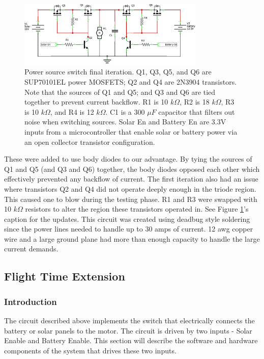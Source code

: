 \documentclass[12pt,journal,compsoc]{IEEEtran}
\begin{document}
\begin{figure}[h!]
\hspace*{0cm}
\centering
\includegraphics[width=3.5in]{solar_circuit3_schem.png}
\caption{Power source switch final iteration. Q1, Q3, Q5, and Q6 are SUP70101EL power MOSFETS; Q2 and Q4 are 2N3904 transistors. Note that the sources of Q1 and Q5; and Q3 and Q6 are tied together to prevent current backflow. R1 is 10 $k\Omega$, R2 is 18 $k\Omega$, R3 is 10 $k\Omega$, and R4 is 12 $k\Omega$. C1 is a 300 $\mu F$ capacitor that filters out noise when switching sources. Solar En and Battery En are 3.3V inputs from a microcontroller that enable solar or battery power via an open collector transistor configuration.}
\label{solSchem2}
\end{figure}
These were added to use body diodes to our advantage. By tying the sources of Q1 and Q5 (and Q3 and Q6) together, the body diodes opposed each other which effectively prevented any backflow of current. The first iteration also had an issue where transistors Q2 and Q4 did not operate deeply enough in the triode region. This caused one to blow during the testing phase. R1 and R3 were swapped with 10 $k\Omega$ resistors to alter the region these transistors operated in. See Figure \ref{solSchem2}'s caption for the updates. This circuit was created using deadbug style soldering since the power lines needed to handle up to 30 amps of current. 12 awg copper wire and a large ground plane had more than enough capacity to handle the large current demands.

\subsection{Flight Time Extension}
\subsubsection{Introduction}
The circuit described above implements the switch that electrically connects the battery or solar panels to the motor. The circuit is driven by two inputs - Solar Enable and Battery Enable. This section will describe the software and hardware components of the system that drives these two inputs. 
\end{document}
